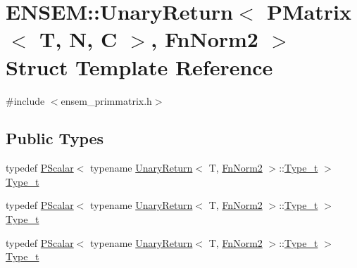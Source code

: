 \hypertarget{structENSEM_1_1UnaryReturn_3_01PMatrix_3_01T_00_01N_00_01C_01_4_00_01FnNorm2_01_4}{}\section{E\+N\+S\+EM\+:\+:Unary\+Return$<$ P\+Matrix$<$ T, N, C $>$, Fn\+Norm2 $>$ Struct Template Reference}
\label{structENSEM_1_1UnaryReturn_3_01PMatrix_3_01T_00_01N_00_01C_01_4_00_01FnNorm2_01_4}


{\ttfamily \#include $<$ensem\+\_\+primmatrix.\+h$>$}

\subsection*{Public Types}
\begin{DoxyCompactItemize}
\item 
typedef \mbox{\hyperlink{classENSEM_1_1PScalar}{P\+Scalar}}$<$ typename \mbox{\hyperlink{structENSEM_1_1UnaryReturn}{Unary\+Return}}$<$ T, \mbox{\hyperlink{structENSEM_1_1FnNorm2}{Fn\+Norm2}} $>$\+::\mbox{\hyperlink{structENSEM_1_1UnaryReturn_3_01PMatrix_3_01T_00_01N_00_01C_01_4_00_01FnNorm2_01_4_ae63cc877c1d04c931821830f6af23b23}{Type\+\_\+t}} $>$ \mbox{\hyperlink{structENSEM_1_1UnaryReturn_3_01PMatrix_3_01T_00_01N_00_01C_01_4_00_01FnNorm2_01_4_ae63cc877c1d04c931821830f6af23b23}{Type\+\_\+t}}
\item 
typedef \mbox{\hyperlink{classENSEM_1_1PScalar}{P\+Scalar}}$<$ typename \mbox{\hyperlink{structENSEM_1_1UnaryReturn}{Unary\+Return}}$<$ T, \mbox{\hyperlink{structENSEM_1_1FnNorm2}{Fn\+Norm2}} $>$\+::\mbox{\hyperlink{structENSEM_1_1UnaryReturn_3_01PMatrix_3_01T_00_01N_00_01C_01_4_00_01FnNorm2_01_4_ae63cc877c1d04c931821830f6af23b23}{Type\+\_\+t}} $>$ \mbox{\hyperlink{structENSEM_1_1UnaryReturn_3_01PMatrix_3_01T_00_01N_00_01C_01_4_00_01FnNorm2_01_4_ae63cc877c1d04c931821830f6af23b23}{Type\+\_\+t}}
\item 
typedef \mbox{\hyperlink{classENSEM_1_1PScalar}{P\+Scalar}}$<$ typename \mbox{\hyperlink{structENSEM_1_1UnaryReturn}{Unary\+Return}}$<$ T, \mbox{\hyperlink{structENSEM_1_1FnNorm2}{Fn\+Norm2}} $>$\+::\mbox{\hyperlink{structENSEM_1_1UnaryReturn_3_01PMatrix_3_01T_00_01N_00_01C_01_4_00_01FnNorm2_01_4_ae63cc877c1d04c931821830f6af23b23}{Type\+\_\+t}} $>$ \mbox{\hyperlink{structENSEM_1_1UnaryReturn_3_01PMatrix_3_01T_00_01N_00_01C_01_4_00_01FnNorm2_01_4_ae63cc877c1d04c931821830f6af23b23}{Type\+\_\+t}}
\end{DoxyCompactItemize}


